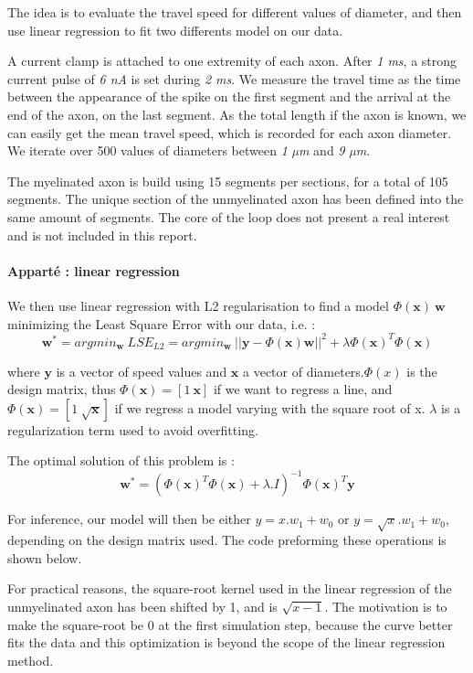 \documentclass[]{article}
\let\oldparagraph\paragraph
\renewcommand{\paragraph}[1]{\oldparagraph{#1}\mbox{}}
\begin{document}
The idea is to evaluate the travel speed for different values of
diameter, and then use linear regression to fit two differents model on
our data.

A current clamp is attached to one extremity of each axon. After \emph{1
ms}, a strong current pulse of \emph{6 nA} is set during \emph{2 ms}. We
measure the travel time as the time between the appearance of the spike
on the first segment and the arrival at the end of the axon, on the last
segment. As the total length if the axon is known, we can easily get the
mean travel speed, which is recorded for each axon diameter. We iterate
over 500 values of diameters between \emph{1 µm} and \emph{9 µm}.

The myelinated axon is build using 15 segments per sections, for a total
of 105 segments. The unique section of the unmyelinated axon has been
defined into the same amount of segments. The core of the loop does not
present a real interest and is not included in this report.

\hypertarget{appartuxe9-linear-regression}{%
\paragraph{Apparté : linear
regression}\label{appartuxe9-linear-regression}}

We then use linear regression with L2 regularisation to find a model
\(\Phi(\textbf{x})\ \textbf{w}\) minimizing the Least Square Error with
our data, i.e. :
\[\textbf{w}^* = argmin_\textbf{w}\ LSE_{L2} = argmin_\textbf{w}\ ||\textbf{y} - \Phi(\textbf{x}) \textbf{w}||^2 + \lambda\Phi(\textbf{x})^T \Phi(\textbf{x})\]

where \(\textbf{y}\) is a vector of speed values and \(\textbf{x}\) a
vector of diameters.\(\Phi(x)\) is the design matrix, thus
\(\Phi(\textbf{x}) = [1\ \textbf{x}]\) if we want to regress a line, and
\(\Phi(\textbf{x}) = [1\ \sqrt{\textbf{x}}]\) if we regress a model
varying with the square root of x. \(\lambda\) is a regularization term
used to avoid overfitting.

The optimal solution of this problem is :
\[ \textbf{w}^* = (\Phi(\textbf{x})^T\Phi(\textbf{x}) + \lambda.I)^{-1}\Phi(\textbf{x})^T \textbf{y}\]

For inference, our model will then be either \(y = x.w_1 + w_0\) or
\(y = \sqrt{x}.w_1 + w_0\), depending on the design matrix used. The
code preforming these operations is shown below.

For practical reasons, the square-root kernel used in the linear
regression of the unmyelinated axon has been shifted by 1, and is
\(\sqrt{x - 1}\). The motivation is to make the square-root be 0 at the
first simulation step, because the curve better fits the data and this
optimization is beyond the scope of the linear regression method.
\end{document}
